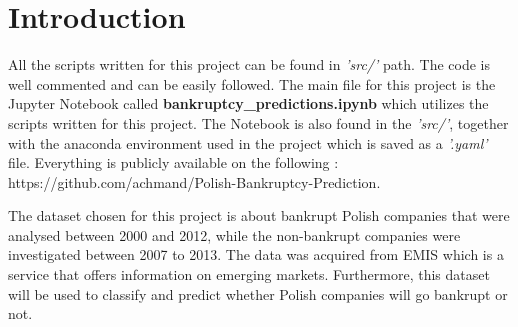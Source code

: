 \chapter{Introduction}\label{chp:introduction}

\noindent All the scripts written for this project can be found in \textit{'src/'} path. The code is well commented and can be easily followed. The main file for this project is the Jupyter Notebook called \textbf{bankruptcy\_predictions.ipynb} which utilizes the scripts written for this project. The Notebook is also found in the \textit{'src/'}, together with the anaconda environment used in the project which is saved as a \textit{'.yaml'} file. Everything is publicly available on the following  : https://github.com/achmand/Polish-Bankruptcy-Prediction. 

\noindent The dataset chosen for this project is about bankrupt Polish companies \cite{PDS:2016} that were analysed between 2000 and 2012, while the non-bankrupt companies were investigated between 2007 to 2013. The data was acquired from EMIS \cite{EMIS:2019} which is a service that offers information on emerging markets. Furthermore, this dataset will be used to classify and predict whether Polish companies will go bankrupt or not. 




